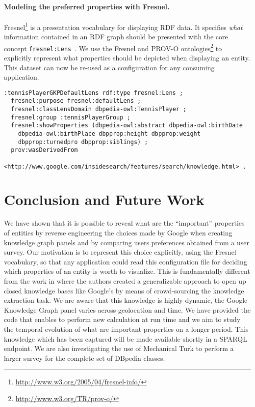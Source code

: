 \documentclass[runningheads,a4paper]{../../Util/LaTEX/llncs}
\begin{document}
\paragraph{\textbf{Modeling the preferred properties with Fresnel.}}
\label{sec:fresnel}
Fresnel\footnote{\url{http://www.w3.org/2005/04/fresnel-info/}} is a presentation vocabulary for displaying RDF data. It specifies \textit{what} information contained in an RDF graph should be presented with the core concept \texttt{fresnel:Lens}~\cite{Pietriga:ISWC:06}. We use the Fresnel and PROV-O ontologies\footnote{\url{http://www.w3.org/TR/prov-o/}} to explicitly represent what properties should be depicted when displaying an entity. This dataset can now be re-used as a configuration for any consuming application.
\begin{lstlisting}
:tennisPlayerGKPDefaultLens rdf:type fresnel:Lens ;
  fresnel:purpose fresnel:defaultLens ;
  fresnel:classLensDomain dbpedia-owl:TennisPlayer ;
  fresnel:group :tennisPlayerGroup ;
  fresnel:showProperties (dbpedia-owl:abstract dbpedia-owl:birthDate
    dbpedia-owl:birthPlace dbpprop:height dbpprop:weight
    dbpprop:turnedpro dbpprop:siblings) ;
  prov:wasDerivedFrom
    <http://www.google.com/insidesearch/features/search/knowledge.html> .
\end{lstlisting}
\normalsize
\vspace{-0.6cm}


\section{Conclusion and Future Work}
\label{sec:conclusion}
We have shown that it is possible to reveal what are the ``important'' properties of entities by reverse engineering the choices made by Google when creating knowledge graph panels and by comparing  users preferences obtained from a user survey. Our motivation is to represent this choice explicitly, using the Fresnel vocabulary, so that any application could read this configuration file for deciding which properties of an entity is worth to visualize. This is fundamentally different from the work in \cite{Steiner:IKEC:12} where the authors created a generalizable approach to open up closed knowledge bases like Google's by means of crowd-sourcing the knowledge extraction task. We are aware that this knowledge is highly dynamic, the Google Knowledge Graph panel varies across geolocation and time. We have provided the code that enables to perform new calculation at run time and we aim to study the temporal evolution of what are important properties on a longer period. This knowledge which has been captured will be made available shortly in a SPARQL endpoint. We are also investigating the use of Mechanical Turk to perform a larger survey for the complete set of DBpedia classes.
\end{document}

